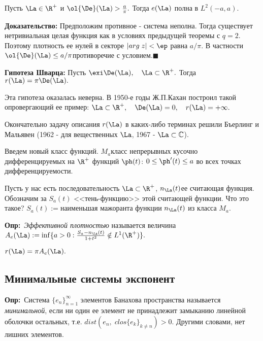 \documentclass[a4paper]{article}
\def\defin{\noindent\textbf{Опр:}\ }
\begin{document}
\begin{theorems}
Пусть $\La\in \R ^{+}$ и
$\ol{\De}(\La)>\frac a{\pi}.$ Тогда $e(\La)$
полна в $L^2(-a,a).$
\end{theorems}
\textbf{Доказательство:} Предположим противное - система неполна.
Тогда существует нетривиальная целая функция как в условиях
предыдущей теоремы с $q=2.$ Поэтому плотность ее нулей в секторе
$|arg\;z|<\ep$ равна $a/\pi$. В частности
$\ol{\De}(\La)\le a/\pi$\т противоречие с
условием.$\blacksquare$

\medskip\noindent \textbf{Гипотеза Шварца:} Пусть
$\exi\De(\La),\quad\La\subset\R ^{+}.$ Тогда
$r(\La)=\pi\De(\La).$

Эта гипотеза оказалась неверна. В 1950-е годы Ж.П.Кахан построил
такой опровергающий ее пример:
$\La\subset\R ^{+},\quad\De(\La)=0,\quad
r(\La)=+\infty.$

Окончательно задачу описания $r(\La)$ в каких-либо терминах
решили Бъерлинг и Мальявен (1962 - для вещественных $\La$,
1967 - $\La\subset\mathbb{C}$).

Введем новый класс функций. $M_a$\т класс непрерывных кусочно
дифференцируемых на $\R ^{+}$ функций $\ph(t)$:
$0\le\ph'(t)\le a$ во всех точках дифференцируемости.

\begin{wrapfigure}[7]{l}{5.4cm}
\end{wrapfigure}

Пусть у нас есть последовательность
$\La\subset\R ^{+}$, $n_{\La}(t)$\т ее считающая
функция. Обозначим за $S_a(t)$ <<тень-функцию>> этой считающей
функции. Что это такое? $S_a(t):=$наименьшая мажоранта функции
$n_{\La}(t)$ из класса $M_a$.

\defin \emph{Эффективной плотностью} называется
величина
$A_e(\La):=\inf\{a>0:\frac{S_a-n_{\La}(t)}{1+t^2}\notin
L^1(\R ^{+})\}.$

\begin{theorems}
$r(\La)=\pi A_e(\La).$
\end{theorems}

\subsection{Минимальные системы экспонент}

\defin Система $\{e_n\}_{n=1}^{\infty}$ элементов Банахова
пространства называется \emph{минимальной}, если ни один ее
элемент не принадлежит замыканию линейной оболочки остальных, т.е.
$dist(e_n,\;clos \{e_k\}_{k\neq n})>0$. Другими словами, нет
лишних элементов.
\end{document}
